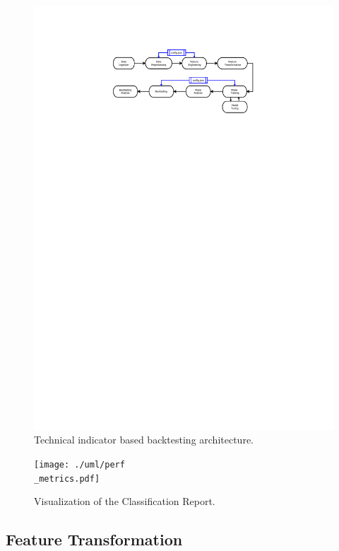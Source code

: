 \begin{figure}[h]
\centering
\includegraphics[page=1, trim=50mm 220mm 20mm 25mm, width=1.3\textwidth, clip]{./uml/ml_pipeline.pdf}
\caption{Technical indicator based backtesting architecture.}
\label{fig:ml_pipeline}
\end{figure}


\begin{figure}
\centering
\texttt{[image: ./uml/perf\\\_metrics.pdf]}
\caption{Visualization of the Classification Report.}
\label{fig:conf_matrix}
\end{figure}

\subsection{Feature Transformation}

